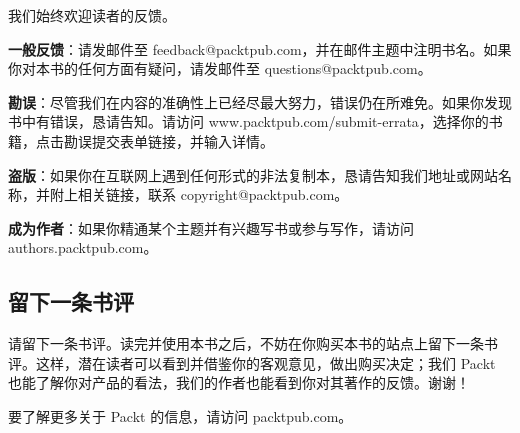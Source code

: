 我们始终欢迎读者的反馈。

\textbf{一般反馈}：请发邮件至 feedback@packtpub.com，并在邮件主题中注明书名。如果你对本书的任何方面有疑问，请发邮件至 questions@packtpub.com。

\textbf{勘误}：尽管我们在内容的准确性上已经尽最大努力，错误仍在所难免。如果你发现书中有错误，恳请告知。请访问 www.packtpub.com/submit-errata，选择你的书籍，点击勘误提交表单链接，并输入详情。

\textbf{盗版}：如果你在互联网上遇到任何形式的非法复制本，恳请告知我们地址或网站名称，并附上相关链接，联系 copyright@packtpub.com。

\textbf{成为作者}：如果你精通某个主题并有兴趣写书或参与写作，请访问 authors.packtpub.com。

\subsection{留下一条书评}

请留下一条书评。读完并使用本书之后，不妨在你购买本书的站点上留下一条书评。这样，潜在读者可以看到并借鉴你的客观意见，做出购买决定；我们 Packt 也能了解你对产品的看法，我们的作者也能看到你对其著作的反馈。谢谢！

要了解更多关于 Packt 的信息，请访问 packtpub.com。
